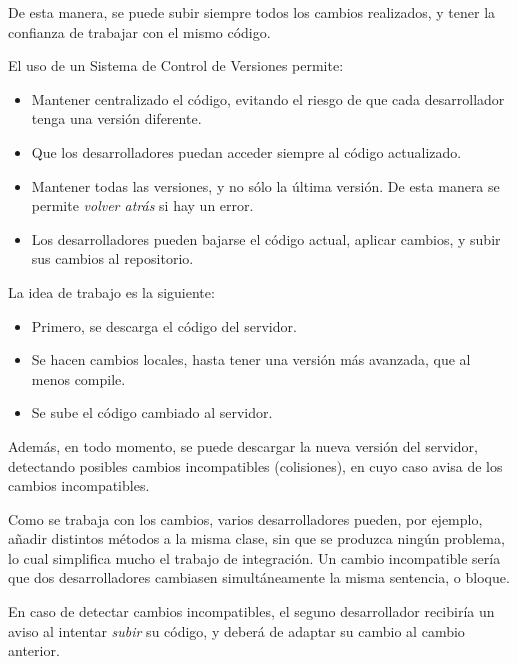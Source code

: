 \documentclass[11pt]{article}
\begin{document}
De esta manera, se puede subir siempre todos los cambios realizados, y tener la
confianza de trabajar con el mismo código.

El uso de un Sistema de Control de Versiones permite: 


\begin{itemize}

\item Mantener centralizado el código, evitando el riesgo de que
cada desarrollador tenga una versión diferente. 

\item Que los desarrolladores
puedan acceder siempre al código actualizado. 

\item Mantener todas las
versiones, y no sólo la última versión. De esta manera se permite \emph{volver
atrás} si hay un error. 

\item Los desarrolladores pueden bajarse el código
actual, aplicar cambios, y subir sus cambios al repositorio. 

\end{itemize}


La idea de trabajo es la siguiente:


\begin{itemize} 

\item Primero, se descarga el código del servidor. 

\item Se
hacen cambios locales, hasta tener una versión más avanzada, que al menos
compile. 

\item Se sube el código cambiado al servidor. 

\end{itemize}


Además, en todo momento, se puede descargar la nueva versión del servidor,
detectando posibles cambios incompatibles (colisiones), en cuyo caso avisa de
los cambios incompatibles.

Como se trabaja con los cambios, varios desarrolladores pueden, por ejemplo,
añadir distintos métodos a la misma clase, sin que se produzca ningún problema,
lo cual simplifica mucho el trabajo de integración. Un cambio incompatible sería
que dos desarrolladores cambiasen simultáneamente la misma sentencia, o bloque.

En caso de detectar cambios incompatibles, el seguno desarrollador recibiría un
aviso al intentar \emph{subir} su código, y deberá de adaptar su cambio al
cambio anterior.
\end{document}
